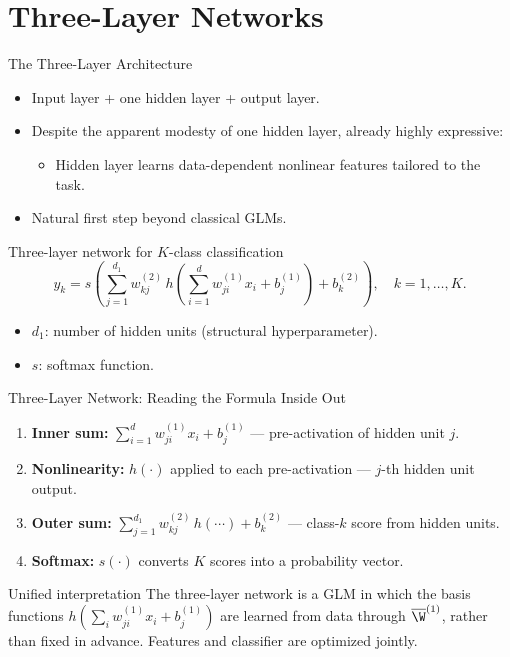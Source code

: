 \section{Three-Layer Networks}

\begin{frame}{The Three-Layer Architecture}
  \begin{itemize}
    \item Input layer + \alert{one hidden layer} + output layer.
    \item Despite the apparent modesty of one hidden layer, already \alert{highly expressive}:
      \begin{itemize}
        \item Hidden layer learns data-dependent nonlinear features tailored to the task.
      \end{itemize}
    \item Natural first step beyond classical GLMs.
  \end{itemize}
  \begin{block}{Three-layer network for $K$-class classification}
    \[
      y_k = s\!\left(\sum_{j=1}^{d_1} w_{kj}^{(2)}\, h\!\left(\sum_{i=1}^{d} w_{ji}^{(1)} x_i + b_j^{(1)}\right) + b_k^{(2)}\right), \quad k=1,\ldots,K.
    \]
  \end{block}
  \begin{itemize}
    \item $d_1$: number of hidden units (structural hyperparameter).
    \item $s$: softmax function.
  \end{itemize}
\end{frame}

\begin{frame}{Three-Layer Network: Reading the Formula Inside Out}
  \begin{enumerate}
    \item \textbf{Inner sum:} $\displaystyle\sum_{i=1}^{d} w_{ji}^{(1)} x_i + b_j^{(1)}$ — pre-activation of hidden unit $j$.
    \item \textbf{Nonlinearity:} $h(\cdot)$ applied to each pre-activation — $j$-th hidden unit output.
    \item \textbf{Outer sum:} $\displaystyle\sum_{j=1}^{d_1} w_{kj}^{(2)}\, h(\cdots) + b_k^{(2)}$ — class-$k$ score from hidden units.
    \item \textbf{Softmax:} $s(\cdot)$ converts $K$ scores into a probability vector.
  \end{enumerate}
  \medskip
  \begin{block}{Unified interpretation}
    The three-layer network is a GLM in which the basis functions
    $h\!\left(\sum_i w_{ji}^{(1)} x_i + b_j^{(1)}\right)$ are \alert{learned from data} through $\overline{\W}^{(1)}$,
    rather than fixed in advance. Features and classifier are \alert{optimized jointly}.
  \end{block}
\end{frame}

